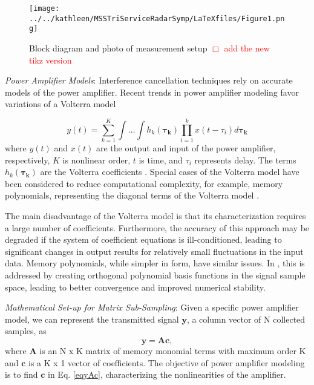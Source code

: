 \par\begin{figure*}[t!]   %
\centering
\texttt{[image: ../../kathleen/MSSTriServiceRadarSymp/LaTeXfiles/Figure1.png]}  %
\caption{Block diagram and photo of measurement setup \textcolor{red}{$\Box$ add the new tikz version}}
\label{fig_sim}
\end{figure*}

\textit{Power Amplifier Models}:
Interference cancellation techniques rely on accurate models of the power amplifier.  Recent trends in power amplifier modeling  \cite{ZhuSimpl, Ding, Raich, Zhuprune} favor variations of a Volterra model \par

\begin{equation}\label{eq1}
y(t) = \sum_{k=1}^K\int\dots\int h_k( \boldsymbol{\tau_k})\prod_{i=1}^kx(t-\tau_i)d \boldsymbol{\tau_k}
\end{equation}
where $y(t)$ and $x(t)$ are the output and input of the power amplifier, respectively, $K$ is nonlinear order, $t$ is time, and $\tau_i$ represents delay.  
The terms $h_k(\boldsymbol{\tau_k})$ are the Volterra coefficients \cite{Zhuprune}.  Special cases of the Volterra model have been considered to reduce computational complexity, for example,  memory polynomials, representing the diagonal terms of the Volterra model \cite{Ding}.  \par
The main disadvantage of the Volterra model is that its characterization requires a large number of coefficients.  Furthermore, the accuracy of this approach may be degraded if the system of coefficient equations is ill-conditioned, leading to significant changes in output results for relatively small fluctuations in the input data.  Memory polynomials, while simpler in form, have similar issues.  In \cite{Raich}, this is addressed by creating orthogonal polynomial basis functions in the signal sample space, leading to better convergence and improved numerical stability. 

\textit{Mathematical Set-up for Matrix Sub-Sampling}:  
Given a specific power amplifier model, we can represent the transmitted signal $\boldsymbol{y}$, a column vector of N collected samples, as 
\begin{equation} \label{eqyAc}
\boldsymbol{y} = \boldsymbol{Ac},
\end{equation}
where $\boldsymbol{A}$ is an N x K matrix of memory monomial terms with maximum order K and $\boldsymbol{c}$ is a K x 1 vector of coefficients.  The objective of power amplifier modeling is to find $\boldsymbol{c}$ in Eq. \ref{eqyAc}, characterizing the nonlinearities of the amplifier. 

